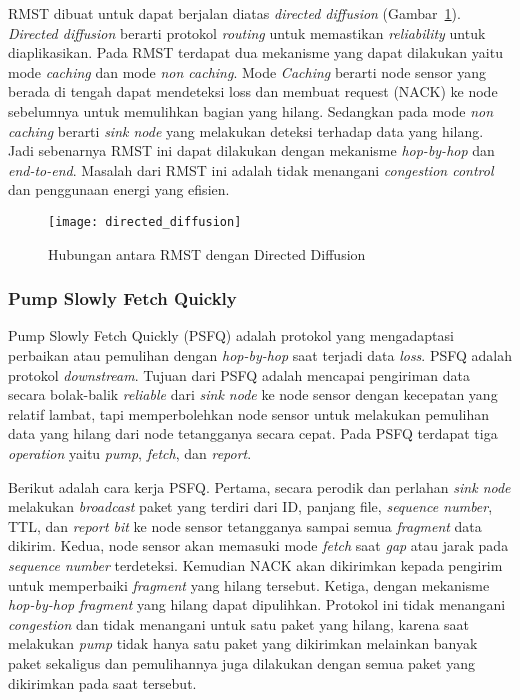RMST dibuat untuk dapat berjalan diatas \textit{directed diffusion} (Gambar~\ref{fig:directed_diffusion}). \textit{Directed diffusion} berarti protokol \textit{routing} untuk memastikan \textit{reliability} untuk diaplikasikan. Pada RMST terdapat dua mekanisme yang dapat dilakukan yaitu mode \textit{caching} dan mode \textit{non caching}. Mode \textit{Caching} berarti node sensor yang berada di tengah dapat mendeteksi loss dan membuat request (NACK) ke node sebelumnya untuk memulihkan bagian yang hilang. Sedangkan pada mode \textit{non caching} berarti \textit{sink node} yang melakukan deteksi terhadap data yang hilang. Jadi sebenarnya RMST ini dapat dilakukan dengan mekanisme \textit{hop-by-hop} dan \textit{end-to-end}. Masalah dari RMST ini adalah tidak menangani \textit{congestion control} dan penggunaan energi yang efisien.
\begin{figure} [H]
	\centering  
	\texttt{[image: directed\_diffusion]}  
	\caption[Hubungan antara RMST dengan Directed Diffusion]{Hubungan antara RMST dengan Directed Diffusion} 
	\label{fig:directed_diffusion} 
\end{figure} 

\subsubsection{Pump Slowly Fetch Quickly}
Pump Slowly Fetch Quickly (PSFQ) adalah protokol yang mengadaptasi perbaikan atau pemulihan dengan \textit{hop-by-hop} saat terjadi data \textit{loss}. PSFQ adalah protokol \textit{downstream}. Tujuan dari PSFQ adalah mencapai pengiriman data secara bolak-balik  \textit{reliable} dari \textit{sink node} ke node sensor dengan kecepatan yang relatif lambat, tapi memperbolehkan node sensor untuk melakukan pemulihan data yang hilang dari node tetangganya secara cepat. Pada PSFQ terdapat tiga \textit{operation} yaitu \textit{pump}, \textit{fetch}, dan \textit{report}. 

Berikut adalah cara kerja PSFQ. Pertama, secara perodik dan perlahan \textit{sink node} melakukan \textit{broadcast} paket yang terdiri dari ID, panjang file, \textit{sequence number}, TTL, dan \textit{report bit} ke node sensor tetangganya sampai semua \textit{fragment} data dikirim. Kedua, node sensor akan memasuki mode \textit{fetch} saat \textit{gap} atau jarak pada \textit{sequence number} terdeteksi. Kemudian NACK akan dikirimkan kepada pengirim untuk memperbaiki \textit{fragment} yang hilang tersebut. Ketiga, dengan mekanisme \textit{hop-by-hop} \textit{fragment} yang hilang dapat dipulihkan. Protokol ini tidak menangani \textit{congestion} dan tidak menangani untuk satu paket yang hilang, karena saat melakukan \textit{pump} tidak hanya satu paket yang dikirimkan melainkan banyak paket sekaligus dan pemulihannya juga dilakukan dengan semua paket yang dikirimkan pada saat tersebut.

